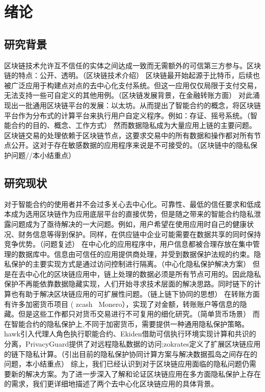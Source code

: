 \chapter{绪论}

\section{研究背景}

区块链技术允许互不信任的实体之间达成一致而无需额外的可信第三方参与。区块链的特点：公开、透明。（区块链技术介绍）
区块链最开始起源于比特币，后续也被广泛应用于构建点对点的去中心化支付系统。但这一应用仅仅局限于支付交易，无法支持一些可自定义的其他用例。（区块链发展背景，在金融转账方面）
对此涌现出一批通用区块链平台的发展：以太坊。从而提出了智能合约的概念，将区块链平台作为分布式的计算平台来执行用户自定义程序。例如：存证、摇号系统。（智能合约的目的、概念、工作方式）
然而数据隐私成为大量应用上链的主要问题。区块链交易的处理依赖于区块链节点，这要求交易中的所有数据和操作都对所有节点公开。这对于存在敏感数据的应用程序来说是不可接受的。（区块链中的隐私保护问题//本小结重点）
\cite{bell2018applications}
\section{研究现状}

对于智能合约的使用者并不会过多关心去中心化。可靠性、最低的信任要求和低成本成为选用区块链作为应用底层平台的直接优势，但是随之带来的智能合约隐私泄露问题成为了亟待解决的一大问题。例如，用户希望在使用应用时自己的健康状况、财务信息等得到保护。同样，在供应链中企业可能需要在数据共享的同时保持竞争优势。（问题复述）
在中心化的应用程序中，用户信息都被合理存放在集中管理的数据库中。信息由可信任的应用提供商处理，并受到数据保护法规的约束。隐私保护的主要实现方式是通过访问控制进行隔离。（中心化隐私保护解决方案）
但是在去中心化的区块链应用中，链上处理的数据必须是所有节点可用的。因此隐私保护不再能依靠数据隐藏实现，人们开始寻求技术层面的解决思路。同时链下的计算也有助于解决区块链应用的可扩展性问题。（链上链下协同的思想）
在转账方面有许多加密货币项目 ( zcash \ Monero），实现了对金额，转账账户等信息的隐藏。但是这些工作都只对货币交易进行不可复用的细化研究。（简单货币场景）
而在智能合约的隐私保护上,不同于加密货币，需要提供一种通用隐私保护策略。hawk引入代理人角色执行职能合约、Ekiden借助可信执行环境实现计算和共识的分离，PrivacyGuard提供了对远程隐私数据的访问;zokrates定义了扩展区块链应用的链下隐私计算。（引出目前的隐私保护协同计算方案与解决数据孤岛之间存在的问题，本小结重点）
综上，我们已经认识到对于区块链应用面临的隐私问题仍需要新的解决方案。为了进一步深入了解和论证区块链应用在多方面隐私保护上存在的需求，我们更详细地描述了两个去中心化区块链应用的具体背景。

